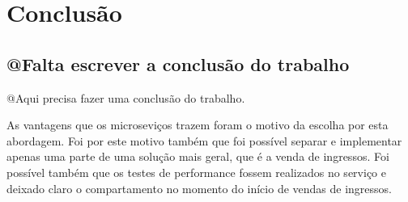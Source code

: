 \chapter*[Conclusão]{Conclusão}

\section{@Falta escrever a conclusão do trabalho}
@Aqui precisa fazer uma conclusão do trabalho.


As vantagens que os microseviços trazem foram o motivo da escolha por esta abordagem.
Foi por este motivo também que foi possível separar e implementar apenas uma parte
de uma solução mais geral, que é a venda de ingressos.
Foi possível também que os testes de performance fossem realizados no serviço e deixado
claro o compartamento no momento do início de vendas de ingressos.
